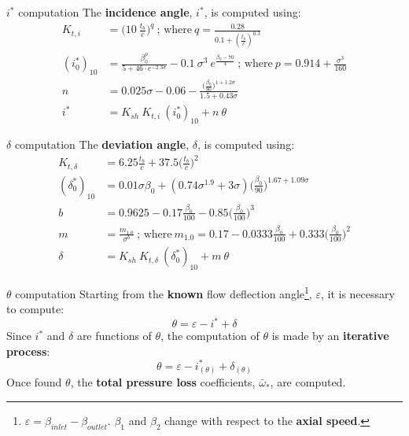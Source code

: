 	\begin{frame}{$i^*$ computation}
		The \textbf{incidence angle}, $i^*$, is computed using:
		\begin{align}
			K_{t,i} & = \Bigg( 10 \ \frac{t_b}{c} \Bigg)^q \ \text{; where} \ q = \frac{0.28}{0.1 + (\frac{t_b}{c})^{0.3}} \nonumber \\ 
			(i^*_0)_{10} & = \frac{\beta_0^p}{5 + 46 \cdot e^{-2.3 \sigma}} - 0.1 \ \sigma^{3} \ e^{\frac{\beta_0 - 70}{4}} \ \text{; where} \ p = 0.914 + \frac{\sigma^3}{160} \nonumber \\
			n & = 0.025 \sigma - 0.06 - \frac{\Big(\frac{\beta_0}{90} \Big)^{1 + 1.2 \sigma}}{1.5 + 0.43 \sigma} \nonumber \\ 
			i^* & = K_{sh} \ K_{t,i} \ (i^*_0)_{10} + n \ \theta \nonumber 
		\end{align}
	\end{frame}

	\begin{frame}{$\delta$ computation}
		The \textbf{deviation angle}, $\delta$, is computed using:
		\begin{align}
			K_{t,\delta} & = 6.25 \frac{t_b}{c} + 37.5 \Bigg(\frac{t_b}{c}\Bigg)^2 \nonumber \\ 
			(\delta^*_0)_{10} & = 0.01 \sigma \beta_0 + (0.74 \sigma^{1.9} + 3 \sigma) \Bigg(\frac{\beta_0}{90}\Bigg)^{1.67 + 1.09 \sigma} \nonumber \\
			b & = 0.9625 - 0.17 \frac{\beta_0}{100} - 0.85 \Bigg(\frac{\beta_0}{100}\Bigg)^3 \nonumber \\ 
			m & = \frac{m_{1.0}}{\sigma^b} \ \text{; where} \ m_{1.0} = 0.17 - 0.0333 \frac{\beta_0}{100} + 0.333 \Bigg(\frac{\beta_0}{100}\Bigg)^2 \nonumber \\
			\delta & = K_{sh} \ K_{t,\delta} \ (\delta^*_0)_{10} + m \ \theta \nonumber  
		\end{align}
	\end{frame}

	\begin{frame}{$\theta$ computation}
		Starting from the \textbf{known} flow deflection angle\footnote{$\varepsilon = \beta_{inlet} - \beta_{outlet}$. $\beta_1$ and $\beta_2$ change with respect to the \textbf{axial speed}.}, $\varepsilon$, it is necessary to compute:
		\begin{equation}
			\theta = \varepsilon - i^* + \delta \nonumber
		\end{equation}
		Since $i^*$ and $\delta$ are functions of $\theta$, the computation of $\theta$ is made by an \textbf{iterative process}:
		\begin{equation}
			\theta = \varepsilon - i^*_{(\theta)} + \delta_{(\theta)} \nonumber
		\end{equation}
		Once found $\theta$, the \textbf{total pressure loss} coefficients, $\bar{\omega}_{*}$, are computed.   
	\end{frame}